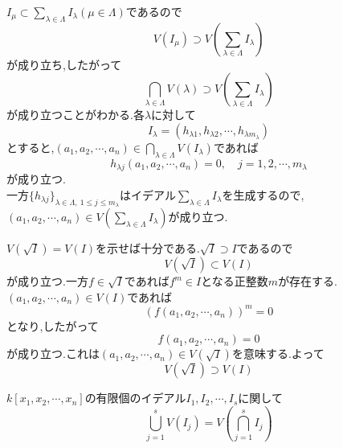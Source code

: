 \documentclass[dvipdfmx,a4paper,11pt]{jsarticle}
\begin{document}
\begin{tcolorbox}[title = 証明(2)]
  $I_{\mu}\subset \sum_{\lambda\in \Lambda}I_{\lambda}(\mu \in \Lambda)$であるので
  \begin{equation*}
    V(I_{\mu})\supset V(\sum_{\lambda\in \Lambda}I_{\lambda})
  \end{equation*}
  が成り立ち,したがって
  \begin{equation*}
    \bigcap_{\lambda \in \Lambda}V(\lambda)\supset V(\sum_{\lambda\in \Lambda}I_{\lambda})
  \end{equation*}
  が成り立つことがわかる.各$\lambda$に対して
  \begin{equation*}
    I_{\lambda}=(h_{\lambda 1},h_{\lambda 2},\cdots,h_{\lambda m_{\lambda}})
  \end{equation*}
  とすると,$(a_{1},a_{2},\cdots,a_{n})\in \bigcap_{\lambda \in \Lambda}V(I_{\lambda})$であれば
  \begin{equation*}
    h_{\lambda j}(a_{1},a_{2},\cdots,a_{n})=0,\quad j=1,2,\cdots,m_{\lambda}
  \end{equation*}
  が成り立つ.\\
  一方$\{h_{\lambda j}\}_{\lambda \in \Lambda,\ 1\leq j\leq m_{\lambda}}$はイデアル$\sum_{\lambda \in \Lambda}I_{\lambda}$を生成するので,
  $(a_{1},a_{2},\cdots,a_{n})\in V(\sum_{\lambda\in \Lambda}I_{\lambda})$が成り立つ.
\end{tcolorbox}
\begin{tcolorbox}[title = 証明(3)]
  $V(\sqrt{I})=V(I)$を示せば十分である.$\sqrt{I}\supset I$であるので
  \begin{equation*}
    V(\sqrt{I})\subset V(I)
  \end{equation*}
  が成り立つ.一方$f\in \sqrt{I}$であれば$f^{m}\in I$となる正整数$m$が存在する.\\
  $(a_{1},a_{2},\cdots,a_{n})\in V(I)$であれば
  \begin{equation*}
    (f(a_{1},a_{2},\cdots,a_{n}))^{m}=0
  \end{equation*}
  となり,したがって
  \begin{equation*}
    f(a_{1},a_{2},\cdots,a_{n})=0
  \end{equation*}
  が成り立つ.これは$(a_{1},a_{2},\cdots,a_{n})\in V(\sqrt{I})$を意味する.よって
  \begin{equation*}
    V(\sqrt{I})\supset V(I)
  \end{equation*}
\end{tcolorbox}
\begin{tcolorbox}[title = 系1.4]
  $k[x_{1},x_{2},\cdots,x_{n}]$の有限個のイデアル$I_{1},I_{2},\cdots,I_{s}$に関して
  \begin{equation*}
    \bigcup_{j=1}^{s}V(I_{j})=V(\bigcap_{j=1}^{s}I_{j})
  \end{equation*}
\end{tcolorbox}
\end{document}
